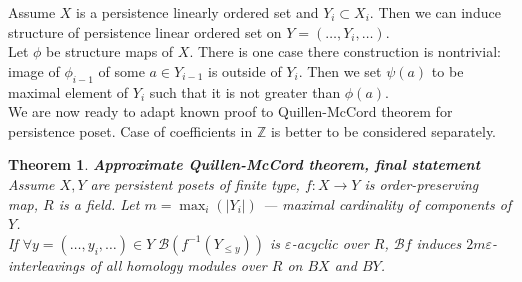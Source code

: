 \documentclass[a4paper, 12pt]{article}
\newtheorem{theorem}{Theorem}
\theoremstyle{definition}
\theoremstyle{remark}
\begin{document}
Assume $X$ is a persistence linearly ordered set and $Y_i \subset X_i$. Then we can induce structure of persistence linear ordered set on $Y = (\ldots, Y_i, \ldots)$.\\
Let $\phi$ be structure maps of $X$. There is one case there construction is nontrivial: image of $\phi_{i-1}$ of some $a \in Y_{i-1}$ is outside of $Y_{i}$. Then we set $\psi(a)$ to be maximal element of $Y_{i}$ such that it is not greater than $\phi(a)$.\\

We are now ready to adapt known proof to Quillen-McCord theorem for persistence poset. Case of coefficients in $\mathbb{Z}$ is better to be considered separately.

\begin{theorem} \textbf{Approximate Quillen-McCord theorem, final statement}\\
  Assume $X, Y$ are persistent posets of finite type, $f : X \to Y$ is order-preserving map, $R$ is a field. Let $m = \max_{i}(|Y_i|)$ --- maximal cardinality of components of $Y$.\\
  If $\forall y=(\ldots,y_i,\ldots) \in Y\;\mathcal{B}(f^{-1}(Y_{\leqslant y}))$ is $\varepsilon$-acyclic over $R$, $\mathcal{B}f$ induces $2m\varepsilon$-interleavings of all homology modules over $R$ on $BX$ and $BY$.\\
\end{theorem}
\end{document}
